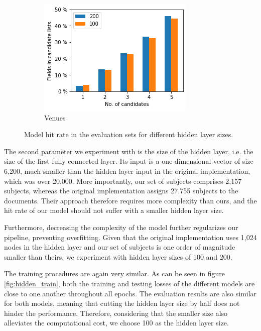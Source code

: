 \begin{figure}
\begin{subfigure}[t]{.32\textwidth}
    \includegraphics[width=\textwidth]{figures/supervised_approach/hidden_venue.png}
    \caption{Venues}
    \label{fig:hidden_venue}
  \end{subfigure}
  \caption{Model hit rate in the evaluation sets for different hidden layer sizes.}
  \label{fig:hidden_eval}
\end{figure}

The second parameter we experiment with is the size of the hidden layer, i.e. the size of the first fully connected layer. Its input is a one-dimensional vector of size 6,200, much smaller than the hidden layer input in the original implementation, which was over 20,000. More importantly, our set of subjects comprises 2,157 subjects, whereas the original implementation assigns 27.755 subjects to the documents. Their approach therefore requires more complexity than ours, and the hit rate of our model should not suffer with a smaller hidden layer size.

Furthermore, decreasing the complexity of the model further regularizes our pipeline, preventing overfitting. Given that the original implementation uses 1,024 nodes in the hidden layer and our set of subjects is one order of magnitude smaller than theirs, we experiment with hidden layer sizes of 100 and 200.

The training procedures are again very similar. As can be seen in figure \ref{fig:hidden_train}, both the training and testing losses of the different models are close to one another throughout all epochs. The evaluation results are also similar for both models, meaning that cutting the hidden layer size by half does not hinder the performance. Therefore, considering that the smaller size also alleviates the computational cost, we choose 100 as the hidden layer size.

